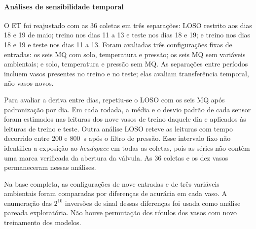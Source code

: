 \paragraph{Análises de sensibilidade temporal}
\label{subsec:sensibilidade_dia_periodo}

O ET foi reajustado com as 36 coletas em três separações: LOSO restrito aos
dias 18 e 19 de maio; treino nos dias 11 a 13 e teste nos dias 18 e 19; e
treino nos dias 18 e 19 e teste nos dias 11 a 13. Foram avaliadas três
configurações fixas de entradas: os seis MQ com solo, temperatura e pressão;
os seis MQ sem variáveis ambientais; e solo, temperatura e pressão sem MQ.
As separações entre períodos incluem vasos presentes no treino e no teste;
elas avaliam transferência temporal, não vasos novos.

Para avaliar a deriva entre dias, repetiu-se o LOSO com os seis MQ após
padronização por dia. Em cada rodada, a média e o desvio padrão de cada
sensor foram estimados nas leituras dos nove vasos de treino daquele dia e
aplicados às leituras de treino e teste. Outra análise LOSO reteve as
leituras com tempo decorrido entre 200 e 800~s após o filtro de pressão.
Esse intervalo fixo não identifica a exposição ao \textit{headspace} em todas
as coletas, pois as séries não contêm uma marca verificada da abertura da
válvula. As 36 coletas e os dez vasos permaneceram nessas análises.

Na base completa, as configurações de nove entradas e de três variáveis
ambientais foram comparadas por diferenças de acurácia em cada vaso. A
enumeração das $2^{10}$ inversões de sinal dessas diferenças foi usada como
análise pareada exploratória. Não houve permutação dos rótulos dos vasos com
novo treinamento dos modelos.
